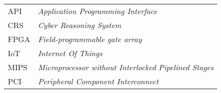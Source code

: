 \begin{longtable}{ll}
  API & \textit{Application Programming Interface} \\
  CRS & \textit{Cyber Reasoning System} \\
  FPGA & \textit{Field-programmable gate array} \\
  IoT & \textit{Internet Of Things} \\
  MIPS & \textit{Microprocessor without Interlocked Pipelined Stages} \\
  PCI & \textit{Peripheral Component Interconnect} \\
\end{longtable}

